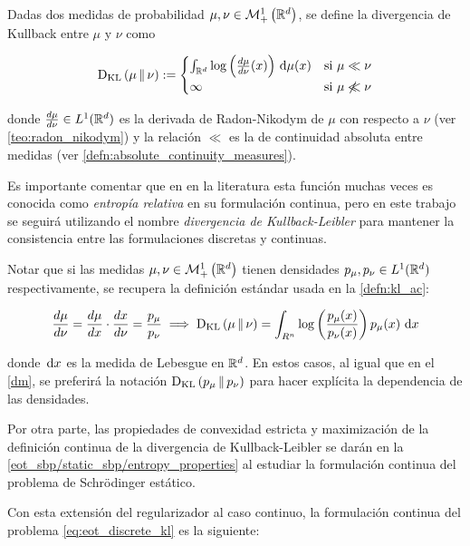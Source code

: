 \begin{defn}
	\label{defn:kl}
	Dadas dos medidas de probabilidad $\mu,\nu\in\mathcal{M}_+^1\left(\mathbb{R}^d\right)$, se define la divergencia de Kullback entre $\mu$ y $\nu$ como

	\begin{equation}
		\operatorname{D_{KL}}\left(\mu\,\|\,\nu\right) :=
		\begin{cases}
			\int_{\mathbb{R}^d} \log\left(\frac{d\mu}{d\nu}(x)\right) \,\operatorname{d}\! \mu(x) & \text{si } \mu\ll\nu       \\
			\infty                                                  & \text{si } \mu \not\ll \nu
		\end{cases}
	\end{equation}

	donde $\frac{d\mu}{d\nu}\in L^1(\mathbb{R}^d)$ es la derivada de Radon-Nikodym de $\mu$ con respecto a $\nu$ (ver \autoref{teo:radon_nikodym}) y la relación $\ll$ es la de continuidad absoluta entre medidas (ver \autoref{defn:absolute_continuity_measures}).
\end{defn}

Es importante comentar que en en la literatura esta función muchas veces es conocida como \textit{entropía relativa} en su formulación continua, pero en este trabajo se seguirá utilizando el nombre \textit{divergencia de Kullback-Leibler} para mantener la consistencia entre las formulaciones discretas y continuas.

Notar que si las medidas $\mu,\nu\in\mathcal{M}_+^1\left(\mathbb{R}^d\right)$ tienen densidades $p_\mu,p_\nu\in L^1(\mathbb{R}^d)$ respectivamente, se recupera la definición estándar usada en la \autoref{defn:kl_ac}:

\begin{equation}
	\frac{d\mu}{d\nu} = \frac{d\mu}{dx} \cdot \frac{dx}{d\nu} = \frac{p_\mu}{p_\nu}
	\implies
	\operatorname{D_{KL}}\left(\mu\,\|\,\nu\right) = \int_{R^n} \log\left(\frac{p_\mu(x)}{p_\nu(x)}\right)p_\mu(x) \,\operatorname{d}\! x
\end{equation}

donde $\,\operatorname{d}\! x$ es la medida de Lebesgue en $\mathbb{R}^d$. En estos casos, al igual que en el \autoref{dm}, se preferirá la notación $\operatorname{D_{KL}}\left(p_\mu\,\|\,p_\nu\right)$ para hacer explícita la dependencia de las densidades.

Por otra parte, las propiedades de convexidad estricta y maximización de la definición continua de la divergencia de Kullback-Leibler se darán en la \autoref{eot_sbp/static_sbp/entropy_properties} al estudiar la formulación continua del problema de Schrödinger estático.

Con esta extensión del regularizador al caso continuo, la formulación continua del problema \autoref{eq:eot_discrete_kl} es la siguiente:

